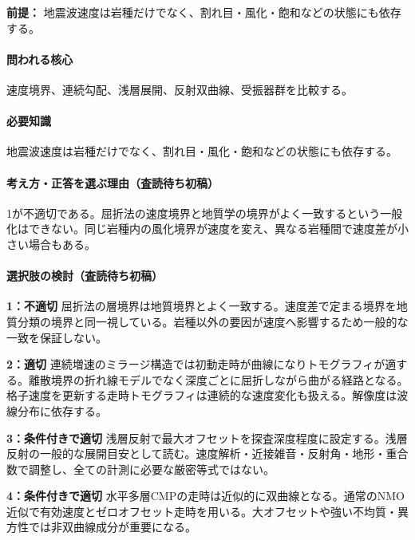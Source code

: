 \noindent\textbf{前提：} 地震波速度は岩種だけでなく、割れ目・風化・飽和などの状態にも依存する。\par

\paragraph{問われる核心} 速度境界、連続勾配、浅層展開、反射双曲線、受振器群を比較する。

\paragraph{必要知識} 地震波速度は岩種だけでなく、割れ目・風化・飽和などの状態にも依存する。

\paragraph{考え方・正答を選ぶ理由（査読待ち初稿）} 1が不適切である。屈折法の速度境界と地質学の境界がよく一致するという一般化はできない。同じ岩種内の風化境界が速度を変え、異なる岩種間で速度差が小さい場合もある。

\paragraph{選択肢の検討（査読待ち初稿）}\mbox{}\par

\noindent\textbf{1：不適切} 屈折法の層境界は地質境界とよく一致する。速度差で定まる境界を地質分類の境界と同一視している。岩種以外の要因が速度へ影響するため一般的な一致を保証しない。\par

\noindent\textbf{2：適切} 連続増速のミラージ構造では初動走時が曲線になりトモグラフィが適する。離散境界の折れ線モデルでなく深度ごとに屈折しながら曲がる経路となる。格子速度を更新する走時トモグラフィは連続的な速度変化も扱える。解像度は波線分布に依存する。\par

\noindent\textbf{3：条件付きで適切} 浅層反射で最大オフセットを探査深度程度に設定する。浅層反射の一般的な展開目安として読む。速度解析・近接雑音・反射角・地形・重合数で調整し、全ての計測に必要な厳密等式ではない。\par

\noindent\textbf{4：条件付きで適切} 水平多層CMPの走時は近似的に双曲線となる。通常のNMO近似で有効速度とゼロオフセット走時を用いる。大オフセットや強い不均質・異方性では非双曲線成分が重要になる。\par

